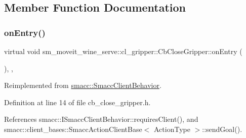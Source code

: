 \subsection{Member Function Documentation}
\mbox{\label{classsm__moveit__wine__serve_1_1cl__gripper_1_1CbCloseGripper_a0b85c3b5f4fe003bec086fa6969bb075}} 
\subsubsection{\texorpdfstring{on\+Entry()}{onEntry()}}
{\footnotesize\ttfamily virtual void sm\+\_\+moveit\+\_\+wine\+\_\+serve\+::cl\+\_\+gripper\+::\+Cb\+Close\+Gripper\+::on\+Entry (\begin{DoxyParamCaption}{ }\end{DoxyParamCaption})\hspace{0.3cm}{\ttfamily [inline]}, {\ttfamily [override]}, {\ttfamily [virtual]}}



Reimplemented from \hyperlink{classsmacc_1_1SmaccClientBehavior_ad5d3e1f1697c3cfe66c94cadba948493}{smacc\+::\+Smacc\+Client\+Behavior}.



Definition at line 14 of file cb\+\_\+close\+\_\+gripper.\+h.



References smacc\+::\+I\+Smacc\+Client\+Behavior\+::requires\+Client(), and smacc\+::client\+\_\+bases\+::\+Smacc\+Action\+Client\+Base$<$ Action\+Type $>$\+::send\+Goal().


